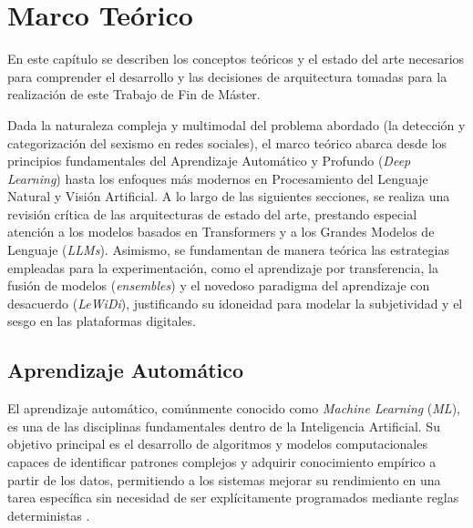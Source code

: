 \chapter{Marco Teórico}
\label{cap:MarcoTeorico}
En este capítulo se describen los conceptos teóricos y el estado del arte necesarios para comprender el desarrollo y las decisiones de arquitectura tomadas para la realización de este Trabajo de Fin de Máster. 

Dada la naturaleza compleja y multimodal del problema abordado (la detección y categorización del sexismo en redes sociales), el marco teórico abarca desde los principios fundamentales del Aprendizaje Automático y Profundo (\textit{Deep Learning}) hasta los enfoques más modernos en Procesamiento del Lenguaje Natural y Visión Artificial. A lo largo de las siguientes secciones, se realiza una revisión crítica de las arquitecturas de estado del arte, prestando especial atención a los modelos basados en Transformers y a los Grandes Modelos de Lenguaje (\textit{LLMs}). Asimismo, se fundamentan de manera teórica las estrategias empleadas para la experimentación, como el aprendizaje por transferencia, la fusión de modelos (\textit{ensembles}) y el novedoso paradigma del aprendizaje con desacuerdo (\textit{LeWiDi}), justificando su idoneidad para modelar la subjetividad y el sesgo en las plataformas digitales. 

\section{Aprendizaje Automático}
\label{sec:AprendizajeAutomatico}
El aprendizaje automático, comúnmente conocido como \textit{Machine Learning} (\textit{ML}), es una de las disciplinas fundamentales dentro de la Inteligencia Artificial. Su objetivo principal es el desarrollo de algoritmos y modelos computacionales capaces de identificar patrones complejos y adquirir conocimiento empírico a partir de los datos, permitiendo a los sistemas mejorar su rendimiento en una tarea específica sin necesidad de ser explícitamente programados mediante reglas deterministas \cite{mitchell1997machine}.

